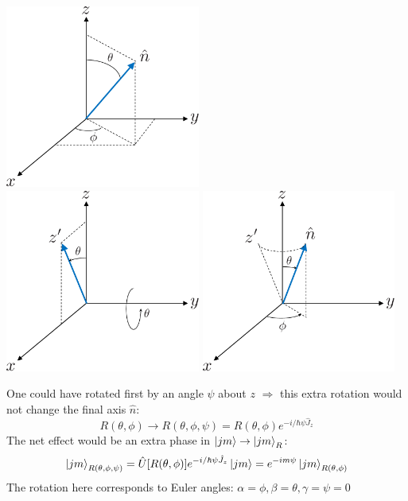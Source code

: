 \documentclass[12pt]{article}
\newcommand{\be}{\begin{equation}}
\newcommand{\ee}{\end{equation}}
\begin{document}
\begin{center}
\includegraphics[width=0.48\textwidth]{Figures/rotation0-crop.pdf}\\[1ex]
\includegraphics[width=0.48\textwidth]{Figures/rotation1-crop.pdf}
\includegraphics[width=0.48\textwidth]{Figures/rotation2-crop.pdf}
\end{center}

One could have rotated first by an angle \(\psi\) about \(z\)
\(\Rightarrow\) this extra rotation would not change the final
axis $\hat{n}$:
\be
R(\theta, \phi) \rightarrow R(\theta, \phi, \psi)=R(\theta, \phi) e^{-i / \hbar \psi \hat{J}_{z}}
\ee
The net effect would be an extra phase in $\ket{jm} \to \ket{jm}_R$:
\[
\ket{jm}_{R(\theta, \phi, \psi)} = 
\hat{U}[R(\theta, \phi)] e^{-i / \hbar \psi \hat{J}_{z}} \ket{jm} = 
e^{-im\psi} \ket{jm}_{R(\theta, \phi)}
\]
The rotation here corresponds to Euler angles: \(\alpha=\phi, \beta=\theta, \gamma=\psi=0\)
\end{document}
